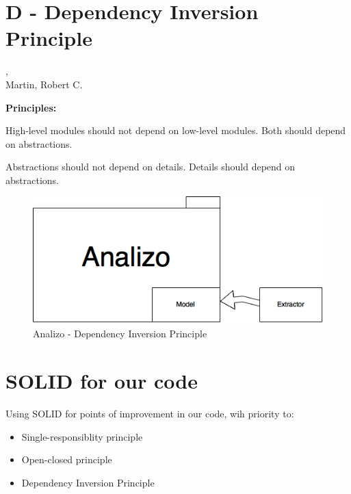 \section{D - Dependency Inversion Principle} %
\label{sec:d}

\begin{frame}
    , \\Martin, Robert C.
\end{frame}

\begin{frame}
    
\begin{Parallel}[v]{5cm}{5cm}
    \textbf{Principles:}
    \ParallelLText%
    {

        High-level modules should not depend on low-level modules. Both should depend on abstractions.
    }
    \ParallelRText%
    {

        Abstractions should not depend on details. Details should depend on abstractions.
    }
\end{Parallel}  

\end{frame}
\begin{frame}

\begin{figure}[!htb]
    \centering
    \includegraphics[scale=0.5]{SOLID-D}
    \caption{Analizo - Dependency Inversion Principle}
\end{figure}
\end{frame}

\section{SOLID for our code} %
\label{sec:our_code}

\begin{frame}

Using SOLID for points of improvement in our code, wih priority to:
\begin{itemize} 
\setlength{\leftmargini}{2.5em}
\item     Single-responsiblity principle
\item     Open-closed principle 
\item     Dependency Inversion Principle
\end{itemize}
\end{frame}

